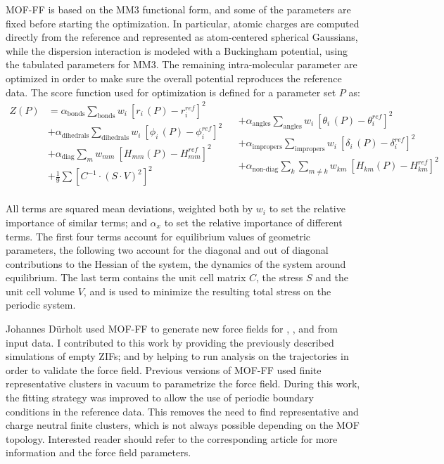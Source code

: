 \documentclass[thesis]{subfiles}
\begin{document}
MOF-FF is based on the MM3 functional form\cite{Allinger1989}, and some of the
parameters are fixed before starting the optimization. In particular, atomic
charges are computed directly from the \abinitio reference and represented as
atom-centered spherical Gaussians, while the dispersion interaction is modeled
with a Buckingham potential, using the tabulated parameters for
MM3\cite{Allinger1994}. The remaining intra-molecular parameter are optimized in
order to make sure the overall potential reproduces the reference data. The
score function used for optimization is defined for a parameter set $P$ as:
\[
\begin{aligned}
    Z(P) &= \alpha_\text{bonds} \sum_\text{bonds} w_i \ \left[r_i\,(P) - r_i^{ref}\right]^2 \\
         &+ \alpha_\text{dihedrals} \sum_\text{dihedrals} w_i \ \left[\phi_i\,(P) - \phi_i^{ref}\right]^2 \\
         &+ \alpha_\text{diag} \sum_m w_{mm} \ \left[H_{mm}(P) - H_{mm}^{ref}\right]^2 \\
         &+ \frac 1 9 \sum \left[C^{-1} \cdot (S \cdot V)^2\right]^2 \\
\end{aligned}
\begin{aligned}
    &+ \alpha_\text{angles} \sum_\text{angles} w_i \ \left[\theta_i\,(P) - \theta_i^{ref}\right]^2 \\
    &+ \alpha_\text{impropers} \sum_\text{impropers} w_i \ \left[\delta_i\,(P) - \delta_i^{ref}\right]^2 \\
    &+ \alpha_\text{non-diag} \sum_k \sum_{m\neq k} w_{km} \ \left[H_{km}(P) - H_{km}^{ref}\right]^2 \\
    &~
\end{aligned}
\]

All terms are squared mean deviations, weighted both by $w_i$ to set the relative
importance of similar terms; and $\alpha_x$ to set the relative importance of
different terms. The first four terms account for equilibrium values of
geometric parameters, the following two account for the diagonal and out of
diagonal contributions to the Hessian of the system, \ie the dynamics of the
system around equilibrium. The last term contains the unit cell matrix $C$, the
stress $S$ and the unit cell volume $V$, and is used to minimize the resulting
total stress on the periodic system.

Johannes Dürholt used MOF-FF to generate new force fields for , \ZIFCl,
and \ZIFBr from \abinitio input data. I contributed to this work by providing
the previously described simulations of empty ZIFs; and by helping to run
analysis on the trajectories in order to validate the force field. Previous
versions of MOF-FF used finite representative clusters in vacuum to parametrize
the force field. During this work, the fitting strategy was improved to allow
the use of periodic boundary conditions in the reference data. This removes the
need to find representative and charge neutral finite clusters, which is not
always possible depending on the MOF topology. Interested reader should refer to
the corresponding article\cite{DuerholtXXXX} for more information and the force
field parameters.
\end{document}
